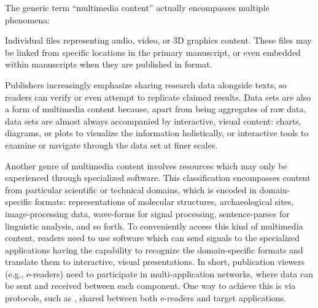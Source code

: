 \documentclass[10pt,letterpaper]{article}
\newcommand{\LPF}{\resizebox{!}{8pt}{\AcronymText{LPF}}}
\newcommand{\textscc}[1]{{\color{orr!35!black}{{%
						\fontfamily{Cabin-TLF}\fontseries{b}\selectfont{\textsc{\scriptsize{#1}}}}}}}
\newcommand{\AcronymText}[1]{{\textscc{#1}}}
\newcommand{\PDF}{\resizebox{!}{8pt}{\AcronymText{PDF}}}
\newcommand{\p}[1]{

\vspace{1em}#1}
\newcommand{\q}[1]{{\fontfamily{qcr}\selectfont ``}#1{\fontfamily{qcr}\selectfont ''}}
\begin{document}
{\p{The generic term \q{multimedia content} actually 
encompasses multiple phenomena:

\vspace{-2em}
\begin{description}[leftmargin=2pt,
	labelindent=-2pt,labelsep=12pt]
\item[Multimedia Files]  Individual 
files representing audio, video, or 3D graphics content.  
These files may be linked from specific locations in 
the primary manuscript, or even embedded within manuscripts 
when they are published in \PDF{} format.
 
\item[Data Sets and Data Visualization]  Publishers 
increasingly emphasize sharing research data alongside 
texts, so readers can verify or even attempt to 
replicate claimed results.  Data sets are also a form 
of multimedia content because, apart from being aggregates 
of raw data, data sets are almost always accompanied 
by interactive, visual content: charts, diagrams, or 
plots to visualize the information holistically, or 
interactive tools to examine or navigate through the 
data set at finer scales.  

\item[Application Networks]  Another genre of multimedia 
content involves resources which may only be experienced 
through specialized software.  This classification encompasses 
content from particular scientific or technical domains, 
which is encoded in domain-specific formats: representations 
of molecular structures, archaeological sites, image-processing 
data, wave-forms for signal processing, sentence-parses for 
linguistic analysis, and so forth.  To conveniently access 
this kind of multimedia content, readers need to use software 
which can send signals to the specialized applications 
having the capability to recognize the domain-specific 
formats and translate them to interactive, 
visual presentations.  In short, publication viewers 
(e.g., e-readers) need to participate in multi-application 
networks, where data can be sent and received between 
each component.  One way to achieve this is via 
protocols, such as \LPF{}, shared between both e-readers and 
target applications.


\end{description}}}
\end{document}
